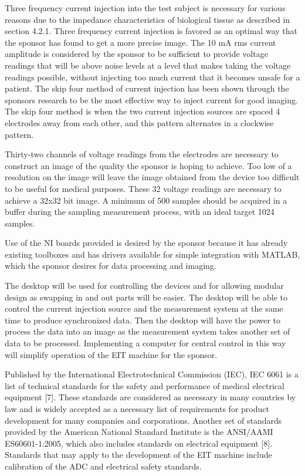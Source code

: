 \documentclass[12pt]{article}
\begin{document}
Three frequency current injection into the test subject is necessary for
various reasons due to the impedance characteristics of biological
tissue as described in section 4.2.1. Three frequency current injection
is favored as an optimal way that the sponsor has found to get a more
precise image. The 10 mA rms current amplitude is considered by the
sponsor to be sufficient to provide voltage readings that will be above
noise levels at a level that makes taking the voltage readings possible,
without injecting too much current that it becomes unsafe for a patient.
The skip four method of current injection has been shown through the
sponsor\textquotesingle s research to be the most effective way to
inject current for good imaging. The skip four method is when the two
current injection sources are spaced 4 electrodes away from each other,
and this pattern alternates in a clockwise pattern.

Thirty-two channels of voltage readings from the electrodes are
necessary to construct an image of the quality the sponsor is hoping to
achieve. Too low of a resolution on the image will leave the image
obtained from the device too difficult to be useful for medical
purposes. These 32 voltage readings are necessary to achieve a 32x32 bit
image. A minimum of 500 samples should be acquired in a buffer during
the sampling measurement process, with an ideal target 1024 samples.

Use of the NI boards provided is desired by the sponsor because it has
already existing toolboxes and has drivers available for simple
integration with MATLAB, which the sponsor desires for data processing
and imaging.

The desktop will be used for controlling the devices and for allowing
modular design as swapping in and out parts will be easier. The desktop
will be able to control the current injection source and the measurement
system at the same time to produce synchronized data. Then the desktop
will have the power to process the data into an image as the measurement
system takes another set of data to be processed. Implementing a
computer for central control in this way will simplify operation of the
EIT machine for the sponsor.

Published by the International Electrotechnical Commission (IEC), IEC
6061 is a list of technical standards for the safety and performance of
medical electrical equipment {[}7{]}. These standards are considered as
necessary in many countries by law and is widely accepted as a necessary
list of requirements for product development for many companies and
corporations. Another set of standards provided by the American National
Standard Institute is the ANSI/AAMI ES60601-1:2005, which also includes
standards on electrical equipment {[}8{]}. Standards that may apply to
the development of the EIT machine include calibration of the ADC and
electrical safety standards.
\end{document}
